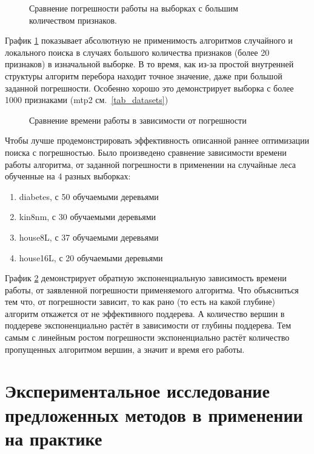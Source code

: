 \begin{figure}[!ht]
    \caption{Сравнение погрешности работы на выборках с большим количеством
    признаков.}\label{errorbig}
\end{figure} 

График \cref{errorbig} показывает абсолютную не применимость алгоритмов
случайного и локального поиска в случаях большого количества признаков (более 20
признаков) в изначальной выборке. В то время, как из-за простой внутренней
структуры алгоритм перебора находит точное значение, даже при большой заданной
погрешности. Особенно хорошо это демонстрирует выборка с более 1000 признаками
(mtp2 см.~\cref{tab_datasets})

\begin{figure}[!ht]
    \caption{Сравнение времени работы в зависимости от
    погрешности}\label{error_to_time}
\end{figure}

Чтобы лучше продемонстрировать эффективность описанной раннее оптимизации поиска
с погрешностью. Было произведено сравнение зависимости времени работы алгоритма,
от заданной погрешности в применении на случайные леса обученные на 4 разных
выборках:

\begin{enumerate}
    \item diabetes, с 50 обучаемыми деревьями
    \item kin8nm, с 30 обучаемыми деревьями
    \item house8L, с 37 обучаемыми деревьями
    \item house16L, с 20 обучаемыми деревьями
\end{enumerate}

График \cref{error_to_time} демонстрирует обратную экспоненциальную зависимость
времени работы, от заявленной погрешности применяемого алгоритма. Что
объясниться тем что, от погрешности зависит, то как рано (то есть на какой
глубине) алгоритм откажется от не эффективного поддерева. А количество вершин
в поддереве экспоненциально растёт в зависимости от глубины поддерева. Тем самым
с линейным ростом погрешности экспоненциально растёт количество пропущенных
алгоритмом вершин, а значит и время его работы. 

\section{Экспериментальное исследование предложенных методов в применении на
практике}

